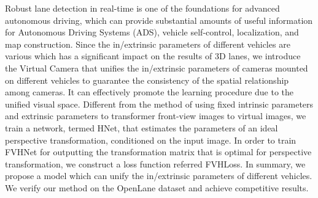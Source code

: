 Robust lane detection in real-time is one of the foundations for advanced autonomous driving,
which can provide substantial amounts of useful information for Autonomous Driving Systems (ADS), vehicle self-control, localization, and map construction.
Since the in/extrinsic parameters of different vehicles are various which has a significant impact on the results of 3D lanes,
we introduce the Virtual Camera that unifies the in/extrinsic parameters of cameras mounted on
different vehicles to guarantee the consistency of the spatial relationship among cameras.
It can effectively promote the learning procedure due to the unified visual space.
Different from the method of using fixed intrinsic parameters and extrinsic parameters to transformer front-view images to virtual images,
we train a network, termed HNet, that estimates the parameters of an ideal perspective transformation, conditioned on the input image.
In order to train FVHNet for outputting the transformation matrix that is optimal for perspective transformation, we construct a loss function referred FVHLoss.
In summary, we propose a model which can unify the in/extrinsic parameters of different vehicles.
We verify our method on the OpenLane dataset and achieve competitive results.